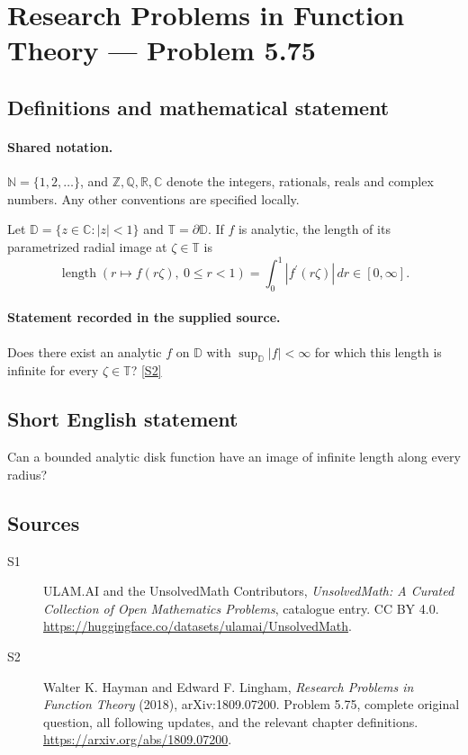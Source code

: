 \documentclass[11pt]{book}
\newcommand{\sref}[2]{\hyperlink{source:#1:#2}{[S#2]}}
\begin{document}
\section{Research Problems in Function Theory — Problem 5.75}\label{statement}

\subsection{Definitions and mathematical statement}

\paragraph{Shared notation.}$\mathbb N=\{1,2,\ldots\}$, and $\mathbb Z,\mathbb Q,\mathbb R,\mathbb C$ denote the integers, rationals, reals and complex numbers. Any other conventions are specified locally.


Let $\mathbb D=\{z\in\mathbb C:|z|<1\}$ and $\mathbb T=\partial\mathbb D$. If $f$ is analytic, the length of its parametrized radial image at $\zeta\in\mathbb T$ is \[\operatorname{length}(r\mapsto f(r\zeta),\ 0\le r<1)=\int_0^1|f^{\prime}(r\zeta)|\,dr\in[0,\infty].\]
\paragraph{Statement recorded in the supplied source.}
Does there exist an analytic $f$ on $\mathbb D$ with $\sup_{\mathbb D}|f|<\infty$ for which this length is infinite for every $\zeta\in\mathbb T$? \sref{statement}{2}
\subsection{Short English statement}
Can a bounded analytic disk function have an image of infinite length along every radius?
\subsection{Sources}
\begin{description}
\item[\hypertarget{source:statement:1}{S1}] ULAM.AI and the UnsolvedMath Contributors, \emph{UnsolvedMath: A Curated Collection of Open Mathematics Problems}, catalogue entry. CC BY 4.0. \url{https://huggingface.co/datasets/ulamai/UnsolvedMath}.
\item[\hypertarget{source:statement:2}{S2}] Walter K. Hayman and Edward F. Lingham, \emph{Research Problems in Function Theory} (2018), arXiv:1809.07200. Problem 5.75, complete original question, all following updates, and the relevant chapter definitions. \url{https://arxiv.org/abs/1809.07200}.
\end{description}
\label{end:statement}
\end{document}
